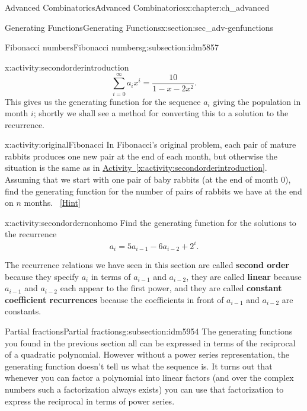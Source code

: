 \documentclass[oneside,10pt,]{book}
\newcommand{\terminology}[1]{\textbf{#1}}
\numberwithin{equation}{chapter}
\begin{document}
\begin{chapterptx}{Advanced Combinatorics}{}{Advanced Combinatorics}{}{}{x:chapter:ch_advanced}
\begin{sectionptx}{Generating Functions}{}{Generating Functions}{}{}{x:section:sec_adv-genfunctions}
\begin{subsectionptx}{Fibonacci numbers}{}{Fibonacci numbers}{}{}{g:subsection:idm5857}
\begin{activity}{}{x:activity:secondorderintroduction}
\begin{equation*}
\sum_{i=0}^\infty a_ix^i = \frac{10}{1-x-2x^2}.
\end{equation*}
This gives us the generating function for the sequence \(a_i\) giving the population in month \(i\); shortly we shall see a method for converting this to a solution to the recurrence.%
\end{activity}
\begin{activity}{}{x:activity:originalFibonacci}%
In Fibonacci's original problem, each pair of mature rabbits produces one new pair at the end of each month, but otherwise the situation is the same as in \hyperref[x:activity:secondorderintroduction]{Activity~\ref{x:activity:secondorderintroduction}}.  Assuming that we start with one pair of baby rabbits (at the end of month 0), find the generating function for the number of pairs of rabbits we have at the end on \(n\) months.%
\qquad~\hfill{\tiny\hyperlink{g:hint:idm5907-back}{[Hint]}}\end{activity}
\begin{activity}{}{x:activity:secondordernonhomo}%
Find the generating function for the solutions to the recurrence%
\begin{equation*}
a_i=5a_{i-1}-6a_{i-2} + 2^i.
\end{equation*}
%
\end{activity}
The recurrence relations we have seen in this section are called \terminology{second order} because they specify \(a_i\) in terms of \(a_{i-1}\) and \(a_{i-2}\), they are called \terminology{linear} because \(a_{i-1}\) and \(a_{i-2}\) each appear to the first power, and they are called \terminology{constant coefficient recurrences} because the coefficients in front of \(a_{i-1}\) and \(a_{i-2}\) are constants.%
\end{subsectionptx}
%
%
\typeout{************************************************}
\typeout{************************************************}
%
\begin{subsectionptx}{Partial fractions}{}{Partial fractions}{}{}{g:subsection:idm5954}
The generating functions you found in the previous section all can be expressed in terms of the reciprocal of a quadratic polynomial. However without a power series representation, the generating function doesn't tell us what the sequence is. It turns out that whenever you can factor a polynomial into linear factors (and over the complex numbers such a factorization always exists) you can use that factorization to express the reciprocal in terms of power series.%

\end{subsectionptx}
\end{sectionptx}
\end{chapterptx}
\end{document}
